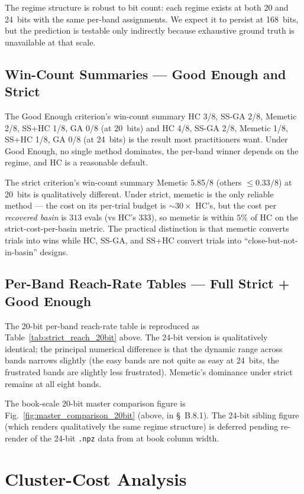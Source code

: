 The regime structure is robust to bit count: each regime exists at
both 20 and 24~bits with the same per-band assignments. We expect
it to persist at 168~bits, but the prediction is testable only
indirectly because exhaustive ground truth is unavailable at that
scale.

\subsection{Win-Count Summaries --- Good Enough and Strict}

The Good Enough criterion's win-count summary HC 3/8, SS-GA 2/8,
Memetic 2/8, SS+HC 1/8, GA 0/8 (at 20~bits) and HC 4/8, SS-GA 2/8,
Memetic 1/8, SS+HC 1/8, GA 0/8 (at 24~bits) is the result most
practitioners want. Under Good Enough, no single method dominates,
the per-band winner depends on the regime, and HC is a reasonable
default.

The strict criterion's win-count summary Memetic 5.85/8 (others
$\leq\!0.33/8$) at 20~bits is qualitatively different. Under
strict, memetic is the only reliable method --- the cost on its
per-trial budget is $\sim\!30\times$ HC's, but the cost per
\emph{recovered basin} is $313$ evals (vs HC's $333$), so memetic
is within $5\%$ of HC on the strict-cost-per-basin metric. The
practical distinction is that memetic converts trials into wins
while HC, SS-GA, and SS+HC convert trials into ``close-but-not-in-basin''
designs.

\subsection{Per-Band Reach-Rate Tables --- Full Strict + Good Enough}

The 20-bit per-band reach-rate table is reproduced as
Table~\ref{tab:strict_reach_20bit} above. The 24-bit version is
qualitatively identical; the principal numerical difference is
that the dynamic range across bands narrows slightly (the easy
bands are not quite as easy at 24~bits, the frustrated bands are
slightly less frustrated). Memetic's dominance under strict
remains at all eight bands.

The book-scale 20-bit master comparison figure is
Fig.~\ref{fig:master_comparison_20bit} (above, in \S~B.8.1). The
24-bit sibling figure (which renders qualitatively the same regime
structure) is deferred pending re-render of the 24-bit
\texttt{.npz} data from \cite{Maloney2026Paper2} at book column
width.

\section{Cluster-Cost Analysis}
\label{app:cluster}

